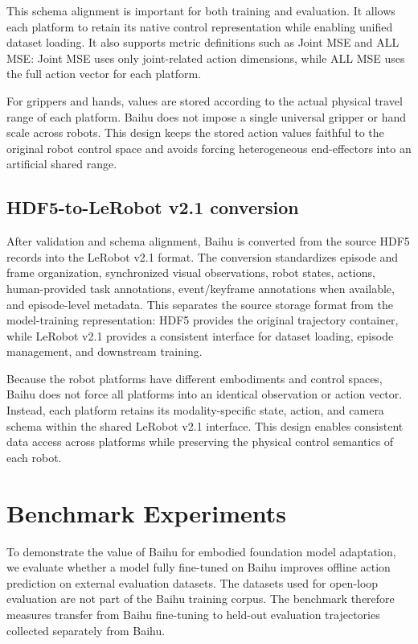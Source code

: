 This schema alignment is important for both training and evaluation. It allows each platform to retain its native control representation while enabling unified dataset loading. It also supports metric definitions such as Joint MSE and ALL MSE: Joint MSE uses only joint-related action dimensions, while ALL MSE uses the full action vector for each platform.

For grippers and hands, values are stored according to the actual physical travel range of each platform. Baihu does not impose a single universal gripper or hand scale across robots. This design keeps the stored action values faithful to the original robot control space and avoids forcing heterogeneous end-effectors into an artificial shared range.

\subsection{HDF5-to-LeRobot v2.1 conversion}

After validation and schema alignment, Baihu is converted from the source HDF5 records into the LeRobot v2.1 format. The conversion standardizes episode and frame organization, synchronized visual observations, robot states, actions, human-provided task annotations, event/keyframe annotations when available, and episode-level metadata. This separates the source storage format from the model-training representation: HDF5 provides the original trajectory container, while LeRobot v2.1 provides a consistent interface for dataset loading, episode management, and downstream training.

Because the robot platforms have different embodiments and control spaces, Baihu does not force all platforms into an identical observation or action vector. Instead, each platform retains its modality-specific state, action, and camera schema within the shared LeRobot v2.1 interface. This design enables consistent data access across platforms while preserving the physical control semantics of each robot.

\section{Benchmark Experiments}

To demonstrate the value of Baihu for embodied foundation model adaptation, we evaluate whether a model fully fine-tuned on Baihu improves offline action prediction on external evaluation datasets. The datasets used for open-loop evaluation are not part of the Baihu training corpus. The benchmark therefore measures transfer from Baihu fine-tuning to held-out evaluation trajectories collected separately from Baihu.

